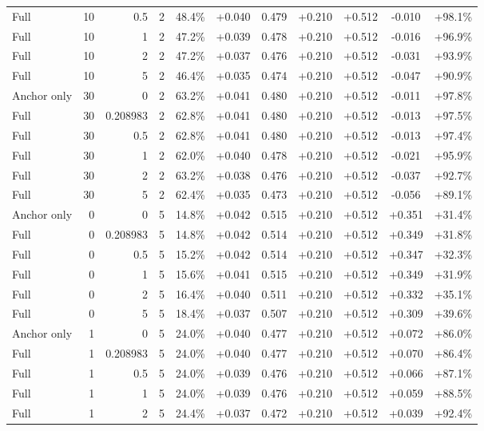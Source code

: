 \begin{table}[htbp]
\begin{tabular}{lrrrccccccc}
Full & 10 & 0.5 & 2 & 48.4\% & +0.040 & 0.479 & +0.210 & +0.512 & -0.010 & +98.1\% \\
Full & 10 & 1 & 2 & 47.2\% & +0.039 & 0.478 & +0.210 & +0.512 & -0.016 & +96.9\% \\
Full & 10 & 2 & 2 & 47.2\% & +0.037 & 0.476 & +0.210 & +0.512 & -0.031 & +93.9\% \\
Full & 10 & 5 & 2 & 46.4\% & +0.035 & 0.474 & +0.210 & +0.512 & -0.047 & +90.9\% \\
Anchor only & 30 & 0 & 2 & 63.2\% & +0.041 & 0.480 & +0.210 & +0.512 & -0.011 & +97.8\% \\
Full & 30 & 0.208983 & 2 & 62.8\% & +0.041 & 0.480 & +0.210 & +0.512 & -0.013 & +97.5\% \\
Full & 30 & 0.5 & 2 & 62.8\% & +0.041 & 0.480 & +0.210 & +0.512 & -0.013 & +97.4\% \\
Full & 30 & 1 & 2 & 62.0\% & +0.040 & 0.478 & +0.210 & +0.512 & -0.021 & +95.9\% \\
Full & 30 & 2 & 2 & 63.2\% & +0.038 & 0.476 & +0.210 & +0.512 & -0.037 & +92.7\% \\
Full & 30 & 5 & 2 & 62.4\% & +0.035 & 0.473 & +0.210 & +0.512 & -0.056 & +89.1\% \\
Anchor only & 0 & 0 & 5 & 14.8\% & +0.042 & 0.515 & +0.210 & +0.512 & +0.351 & +31.4\% \\
Full & 0 & 0.208983 & 5 & 14.8\% & +0.042 & 0.514 & +0.210 & +0.512 & +0.349 & +31.8\% \\
Full & 0 & 0.5 & 5 & 15.2\% & +0.042 & 0.514 & +0.210 & +0.512 & +0.347 & +32.3\% \\
Full & 0 & 1 & 5 & 15.6\% & +0.041 & 0.515 & +0.210 & +0.512 & +0.349 & +31.9\% \\
Full & 0 & 2 & 5 & 16.4\% & +0.040 & 0.511 & +0.210 & +0.512 & +0.332 & +35.1\% \\
Full & 0 & 5 & 5 & 18.4\% & +0.037 & 0.507 & +0.210 & +0.512 & +0.309 & +39.6\% \\
Anchor only & 1 & 0 & 5 & 24.0\% & +0.040 & 0.477 & +0.210 & +0.512 & +0.072 & +86.0\% \\
Full & 1 & 0.208983 & 5 & 24.0\% & +0.040 & 0.477 & +0.210 & +0.512 & +0.070 & +86.4\% \\
Full & 1 & 0.5 & 5 & 24.0\% & +0.039 & 0.476 & +0.210 & +0.512 & +0.066 & +87.1\% \\
Full & 1 & 1 & 5 & 24.0\% & +0.039 & 0.476 & +0.210 & +0.512 & +0.059 & +88.5\% \\
Full & 1 & 2 & 5 & 24.4\% & +0.037 & 0.472 & +0.210 & +0.512 & +0.039 & +92.4\% \\

\end{tabular}
\end{table}
